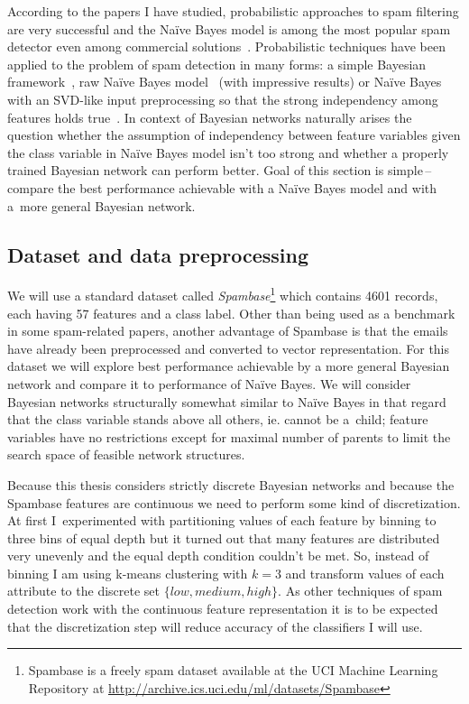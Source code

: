 \documentclass[english,cover]{fitthesis} %
\newcommand{\term}[1]{\emph{#1}}           %
\begin{document}
According to the papers I have studied, probabilistic approaches to spam filtering are very successful and the Naïve Bayes model is among the most popular spam detector even among commercial solutions~\cite{blanzieri09}. Probabilistic techniques have been applied to the problem of spam detection in many forms: a simple Bayesian framework~\cite{isaac09}, raw Naïve Bayes model~\cite{heckerman98_spam} (with impressive results) or Naïve Bayes with an SVD-like input preprocessing so that the strong independency among features holds true~\cite{renuka11}. In context of Bayesian networks naturally arises the question whether the assumption of independency between feature variables given the class variable in Naïve Bayes model isn't too strong and whether a properly trained Bayesian network can perform better. Goal of this section is simple\,--\,compare the best performance achievable with a Naïve Bayes model and with a~more general Bayesian network.


\subsection{Dataset and data preprocessing}
We will use a standard dataset called \term{Spambase}\footnote{Spambase is a freely spam dataset available at the UCI Machine Learning Repository at \url{http://archive.ics.uci.edu/ml/datasets/Spambase}} which contains 4601 records, each having 57 features and a class label. Other than being used as a benchmark in some spam-related papers, another advantage of Spambase is that the emails have already been preprocessed and converted to vector representation. For this dataset we will explore best performance achievable by a more general Bayesian network and compare it to performance of Naïve Bayes. We will consider Bayesian networks structurally somewhat similar to Naïve Bayes in that regard that the class variable stands above all others, ie. cannot be a~child; feature variables have no restrictions except for maximal number of parents to limit the search space of feasible network structures.

Because this thesis considers strictly discrete Bayesian networks and because the Spambase features are continuous we need to perform some kind of discretization. At first I~experimented with partitioning values of each feature by binning to three bins of equal depth but it turned out that many features are distributed very unevenly and the equal depth condition couldn't be met. So, instead of binning I am using k-means clustering with $k=3$ and transform values of each attribute to the discrete set $\lbrace low, medium, high \rbrace$. As other techniques of spam detection work with the continuous feature representation it is to be expected that the discretization step will reduce accuracy of the classifiers I will use.
\end{document}
